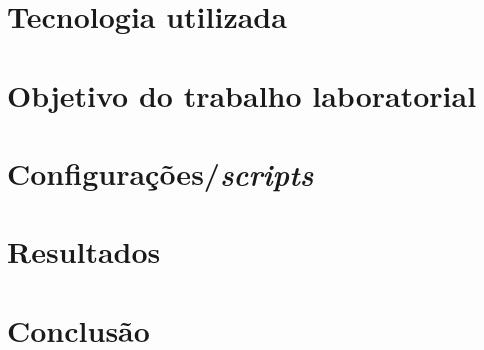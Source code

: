 \section*{Tecnologia utilizada}


\section*{Objetivo do trabalho laboratorial}


\section*{Configurações/\textit{scripts}}


\section*{Resultados}


\section*{Conclusão}
